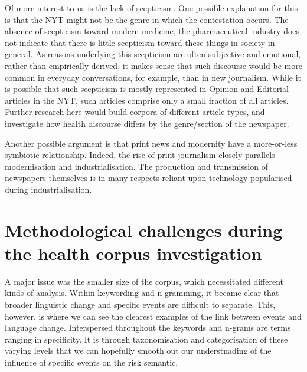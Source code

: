 Of more interest to us is the lack of scepticism. One possible explanation for this is that the NYT might not be the genre in which the contestation occurs. The absence of scepticism toward modern medicine, the pharmaceutical industry does not indicate that there is little scepticism toward these things in society in general. As reasons underlying this scepticism are often subjective and emotional, rather than empirically derived, it makes sense that such discourse would be more common in everyday conversations, for example, than in new journalism. While it is possible that such scepticism is mostly represented in Opinion and Editorial articles in the NYT, such articles comprise only a small fraction of all articles. Further research here would build corpora of different article types, and investigate how health discourse differs by the genre\slash section of the newspaper.

Another possible argument is that print news and modernity have a more-or-less symbiotic relationship. Indeed, the rise of print journalism closely parallels modernisation and industrialisation. The production and transmission of newspapers themselves is in many respects reliant upon technology popularised during industrialisation.



\section{Methodological challenges during the health corpus investigation}

A major issue was the smaller size of the corpus, which necessitated different kinds of analysis. Within keywording and n-gramming, it became clear that broader linguistic change and specific events are difficult to separate. This, however, is where we can see the clearest examples of the link between events and language change. Interspersed throughout the keywords and n-grams are terms ranging in specificity. It is through taxonomisation and categorisation of these varying levels that we can hopefully smooth out our understnading of the influence of specific events on the risk semantic.

